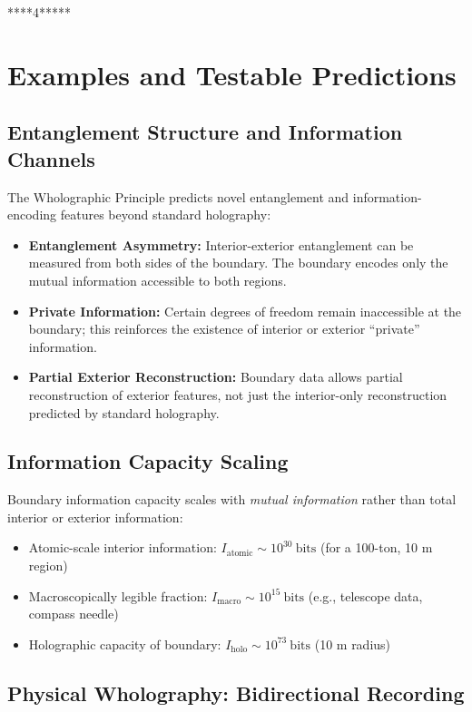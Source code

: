 ﻿\documentclass[12pt]{article}
\begin{document}
****4*****
\section{Examples and Testable Predictions}


\subsection{Entanglement Structure and Information Channels}


The Wholographic Principle predicts novel entanglement and information-encoding features beyond standard holography:


\begin{itemize}
  \item \textbf{Entanglement Asymmetry:} Interior-exterior entanglement can be measured from both sides of the boundary. The boundary encodes only the mutual information accessible to both regions.
  \item \textbf{Private Information:} Certain degrees of freedom remain inaccessible at the boundary; this reinforces the existence of interior or exterior “private” information.
  \item \textbf{Partial Exterior Reconstruction:} Boundary data allows partial reconstruction of exterior features, not just the interior-only reconstruction predicted by standard holography.
\end{itemize}


\subsection{Information Capacity Scaling}


Boundary information capacity scales with \emph{mutual information} rather than total interior or exterior information:


\begin{itemize}
  \item Atomic-scale interior information: $I_\mathrm{atomic} \sim 10^{30}~\mathrm{bits}$ (for a 100-ton, 10 m region)
  \item Macroscopically legible fraction: $I_\mathrm{macro} \sim 10^{15}~\mathrm{bits}$ (e.g., telescope data, compass needle)
  \item Holographic capacity of boundary: $I_\mathrm{holo} \sim 10^{73}~\mathrm{bits}$ (10 m radius)
\end{itemize}


\subsection{Physical Wholography: Bidirectional Recording}
\end{document}
